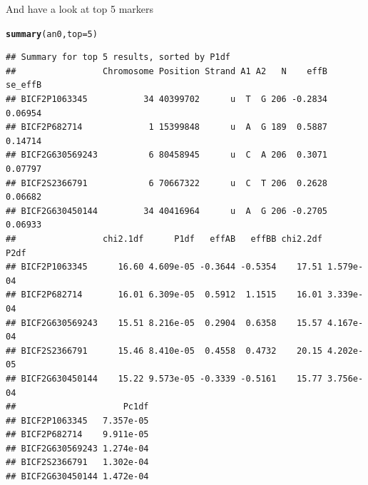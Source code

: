 \documentclass[12pt,a4paper,oneside]{article}\usepackage[]{graphicx}\usepackage[]{color}
\makeatletter
\newcommand{\hlnum}[1]{\textcolor[rgb]{0.686,0.059,0.569}{#1}}%
\newcommand{\hlstd}[1]{\textcolor[rgb]{0.345,0.345,0.345}{#1}}%
\newcommand{\hlkwc}[1]{\textcolor[rgb]{0.333,0.667,0.333}{#1}}%
\newcommand{\hlkwd}[1]{\textcolor[rgb]{0.737,0.353,0.396}{\textbf{#1}}}%
\newenvironment{kframe}{%
 \def\at@end@of@kframe{}%
 \ifinner\ifhmode%
  \def\at@end@of@kframe{\end{minipage}}%
  \begin{minipage}{\columnwidth}%
 \fi\fi%
 \def\FrameCommand##1{\hskip\@totalleftmargin \hskip-\fboxsep
 \colorbox{shadecolor}{##1}\hskip-\fboxsep
     \hskip-\linewidth \hskip-\@totalleftmargin \hskip\columnwidth}%
 \MakeFramed {\advance\hsize-\width
   \@totalleftmargin\z@ \linewidth\hsize
   \@setminipage}}%
 {\par\unskip\endMakeFramed%
 \at@end@of@kframe}
\newenvironment{knitrout}{}{} %
\makeatother
\begin{document}
\noindent And have a look at top 5 markers

\begin{knitrout}\footnotesize
{}\color{fgcolor}\begin{kframe}
\begin{alltt}
\hlkwd{summary}\hlstd{(an0,} \hlkwc{top} \hlstd{=} \hlnum{5}\hlstd{)}
\end{alltt}
\begin{verbatim}
## Summary for top 5 results, sorted by P1df
##                 Chromosome Position Strand A1 A2   N    effB se_effB
## BICF2P1063345           34 40399702      u  T  G 206 -0.2834 0.06954
## BICF2P682714             1 15399848      u  A  G 189  0.5887 0.14714
## BICF2G630569243          6 80458945      u  C  A 206  0.3071 0.07797
## BICF2S2366791            6 70667322      u  C  T 206  0.2628 0.06682
## BICF2G630450144         34 40416964      u  A  G 206 -0.2705 0.06933
##                 chi2.1df      P1df   effAB   effBB chi2.2df      P2df
## BICF2P1063345      16.60 4.609e-05 -0.3644 -0.5354    17.51 1.579e-04
## BICF2P682714       16.01 6.309e-05  0.5912  1.1515    16.01 3.339e-04
## BICF2G630569243    15.51 8.216e-05  0.2904  0.6358    15.57 4.167e-04
## BICF2S2366791      15.46 8.410e-05  0.4558  0.4732    20.15 4.202e-05
## BICF2G630450144    15.22 9.573e-05 -0.3339 -0.5161    15.77 3.756e-04
##                     Pc1df
## BICF2P1063345   7.357e-05
## BICF2P682714    9.911e-05
## BICF2G630569243 1.274e-04
## BICF2S2366791   1.302e-04
## BICF2G630450144 1.472e-04
\end{verbatim}
\end{kframe}
\end{knitrout}
\end{document}
